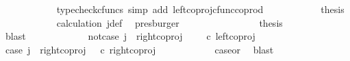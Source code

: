 \begin{isabellebody}
\ \ \ \ \ \ \ \ \ \ \isamarkupfalse%
\ {\isacharparenleft}{\kern0pt}typecheck{\isacharunderscore}{\kern0pt}cfuncs{\isacharcomma}{\kern0pt}\ simp\ add{\isacharcolon}{\kern0pt}\ left{\isacharunderscore}{\kern0pt}coproj{\isacharunderscore}{\kern0pt}cfunc{\isacharunderscore}{\kern0pt}coprod{\isacharparenright}{\kern0pt}\isanewline
\ \ \ \ \ \ \ \ \isamarkupfalse%
\ \isamarkupfalse%
\ {\isacharquery}{\kern0pt}thesis\isanewline
\ \ \ \ \ \ \ \ \ \ \isamarkupfalse%
\ calculation\ j{\isacharunderscore}{\kern0pt}def\ \isamarkupfalse%
\ presburger\isanewline
\ \ \ \ \ \ \isamarkupfalse%
\isanewline
\ \ \ \ \ \ \isamarkupfalse%
\ \isamarkupfalse%
\ {\isacharquery}{\kern0pt}thesis\isanewline
\ \ \ \ \ \ \ \ \isamarkupfalse%
\ blast\isanewline
\ \ \ \ \isamarkupfalse%
\isanewline
\ \ \ \ \ \ \isamarkupfalse%
\ not{\isacharunderscore}{\kern0pt}case{}{\isacharcolon}{\kern0pt}\ {\isachardoublequoteopen}j\ {\isasymnoteq}\ right{\isacharunderscore}{\kern0pt}coproj\ {\isasymone}\ {\isacharparenleft}{\kern0pt}{\isasymone}\ {\isasymCoprod}\ {\isasymone}{\isacharparenright}{\kern0pt}\ {\isasymcirc}\isactrlsub c\ left{\isacharunderscore}{\kern0pt}coproj\ {\isasymone}\ {\isasymone}{\isachardoublequoteclose}\isanewline
\ \ \ \ \ \ \isamarkupfalse%
\ \isamarkupfalse%
\ case{}{\isacharcolon}{\kern0pt}\ {\isachardoublequoteopen}j\ {\isacharequal}{\kern0pt}\ right{\isacharunderscore}{\kern0pt}coproj\ {\isasymone}\ {\isacharparenleft}{\kern0pt}{\isasymone}{\isasymCoprod}{\isasymone}{\isacharparenright}{\kern0pt}\ {\isasymcirc}\isactrlsub c\ right{\isacharunderscore}{\kern0pt}coproj\ {\isasymone}\ {\isasymone}{\isachardoublequoteclose}\isanewline
\ \ \ \ \ \ \ \ \isamarkupfalse%
\ case{}{\isacharunderscore}{\kern0pt}or{\isacharunderscore}{\kern0pt}{}\ \isamarkupfalse%
\ blast\isanewline
\ \ \ \ \ \ \isamarkupfalse%
\ {\isachardoublequoteopen}{\isasymlangle}{\isasymf}{\isacharcomma}{\kern0pt}\ {\isasymt}{\isasymrangle}\ {\isacharequal}{\kern0pt}\ {\isasymlangle}{\isasymt}{\isacharcomma}{\kern0pt}{\isasymt}{\isasymrangle}{\isachardoublequoteclose}\isanewline
\ \ \ \ \ \ \isamarkupfalse%
\ {\isacharminus}{\kern0pt}\ \isanewline
\ \ \ \ \ \ \ \ \isamarkupfalse%

\end{isabellebody}
